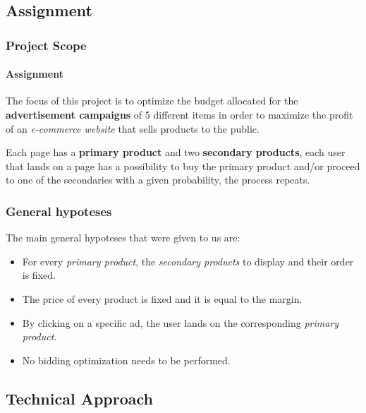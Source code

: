 
\subsection{Assignment}


\begin{frame}

\frametitle{Project Scope}
\framesubtitle{Assignment}

The focus of this project is to optimize the budget allocated for the \textbf{advertisement campaigns} of 5 different items in order to maximize the profit of an \textit{e-commerce website} that sells products to the public.

Each page has a \textbf{primary product} and two \textbf{secondary products}, each user that lands on a page has a possibility to buy the primary product and/or proceed to one of the secondaries with a given probability, the process repeats.

\end{frame}



\begin{frame}

\frametitle{General hypoteses}

The main general hypoteses that were given to us are:
\begin{itemize}[label={-}]
    \item For every \textit{primary product}, the \textit{secondary products} to display and their order is fixed.
    \item The price of every product is fixed and it is equal to the margin.
    \item By clicking on a specific ad, the user lands on the corresponding \textit{primary product}.
    \item No bidding optimization needs to be performed.
\end{itemize}

\end{frame}


\subsection{Technical Approach}

